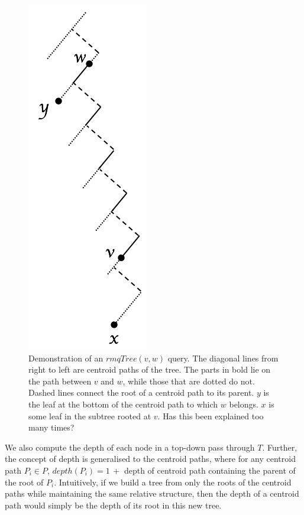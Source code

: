 \documentclass{article}
\begin{document}
    \begin{figure}[h]
        \includegraphics[scale=0.5]{rmq}
        \centering
        \caption{Demonstration of an $rmqTree(v, w)$ query. The diagonal lines from right to left are centroid paths of the tree. The parts in bold lie on the path between $v$ and $w$, while those that are dotted do not. Dashed lines connect the root of a centroid path to its parent. $y$ is the leaf at the bottom of the centroid path to which $w$ belongs. $x$ is some leaf in the subtree rooted at $v$. {\color{red} Has this been explained too many times?}}
        \label{fig:rmq}
    \end{figure}

    We also compute the depth of each node in a top-down pass through $T$. Further, the concept of depth is generalised to the centroid paths, where for any centroid path $P_i \in P$, $depth(P_i) = 1\, +$ depth of centroid path containing the parent of the root of $P_i$. Intuitively, if we build a tree from only the roots of the centroid paths while maintaining the same relative structure, then the depth of a centroid path would simply be the depth of its root in this new tree.
    \newline
\end{document}
